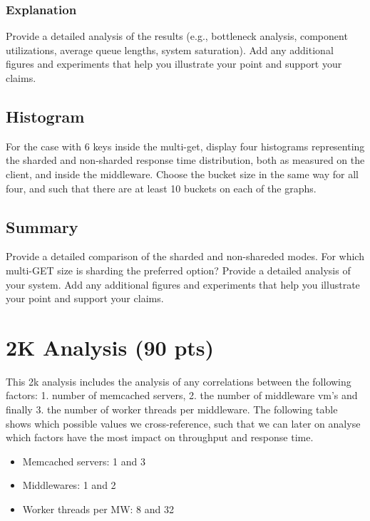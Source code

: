 \documentclass[11pt,a4paper]{article}
\begin{document}
\subsubsection{Explanation}

Provide a detailed analysis of the results (e.g., bottleneck analysis, component utilizations, average queue lengths, system saturation). Add any additional figures and experiments that help you illustrate your point and support your claims.

\subsection{Histogram}

For the case with 6 keys inside the multi-get, display four histograms representing the sharded and non-sharded response time distribution, both as measured on the client, and inside the middleware. Choose the bucket size in the same way for all four, and such that there are at least 10 buckets on each of the graphs.

\subsection{Summary}

Provide a detailed comparison of the sharded and non-shareded modes. For which multi-GET size is sharding the preferred option? Provide a detailed analysis of your system. Add any additional figures and experiments that help you illustrate your point and support your claims.

\section{2K Analysis (90 pts)}

This 2k analysis includes the analysis of any correlations between the following factors: 1. number of memcached servers, 2. the number of middleware vm's and finally 3. the number of worker threads per middleware.
The following table shows which possible values we cross-reference, such that we can later on analyse which factors have the most impact on throughput and response time.

\begin{itemize}
		
	\item Memcached servers: 1 and 3
	\item Middlewares: 1 and 2
	\item Worker threads per MW: 8 and 32
	      	      
\end{itemize}
\end{document}
